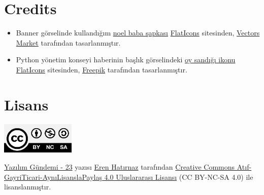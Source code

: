 \documentclass[11pt]{article}
\begin{document}
\section{Credits}
\label{sec:org3d84452}
\begin{itemize}
\item Banner görselinde kullandığım \href{https://www.flaticon.com/free-icon/hat\_744546}{noel baba şapkası} \href{https://www.flaticon.com/}{FlatIcons} sitesinden,
\href{https://www.flaticon.com/authors/vectors-market}{Vectors Market} tarafından tasarlanmıştır.
\item Python yönetim konseyi haberinin başlık görselindeki \href{https://www.flaticon.com/free-icon/elections\_1582013}{oy sandığı ikonu}
\href{https://flaticon.com}{FlatIcons} sitesinden, \href{https://www.flaticon.com/authors/freepik}{Freepik} tarafından tasarlanmıştır.
\end{itemize}
\section{Lisans}
\label{sec:org103ffab}
\begin{center}
\begin{center}
\includegraphics[height=1.5cm]{../../../img/CC_BY-NC-SA_4.0.png}
\end{center}

\href{yazilim-gundemi-23.pdf}{Yazılım Gündemi - 23} yazısı \href{https://erenhatirnaz.github.io}{Eren Hatırnaz} tarafından \href{http://creativecommons.org/licenses/by-nc-sa/4.0/}{Creative Commons
Atıf-GayriTicari-AynıLisanslaPaylaş 4.0 Uluslararası Lisansı} (CC BY-NC-SA 4.0)
ile lisanslanmıştır.
\end{center}
\end{document}
